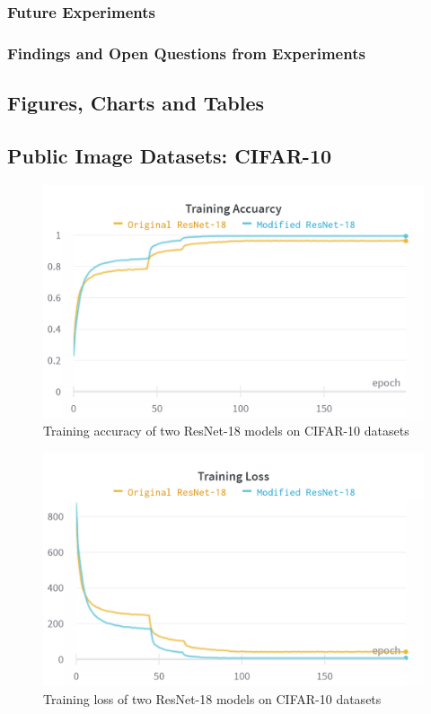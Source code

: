 \documentclass[twocolumn, draft]{extarticle}
\begin{document}
\subsubsection{Future Experiments}
\subsubsection{Findings and Open Questions from Experiments}


\clearpage
{}%
\renewcommand*{\thepage}{A. \arabic{page}}
\begin{appendices}
\section{Figures, Charts and Tables}

\subsection{Public Image Datasets: CIFAR-10}

\begin{figure}[H]
\centering
\includegraphics[width=0.9\linewidth]{charts/Section-2-Panel-0-uzzeut0la}
\caption{Training accuracy of two ResNet-18 models on CIFAR-10 datasets}
\label{chart: res_1}
\end{figure}

\begin{figure}[H]
\centering
\includegraphics[width=0.9\linewidth]{charts/Section-2-Panel-1-crmf3l46q}
\caption{Training loss of two ResNet-18 models on CIFAR-10 datasets}
\label{chart: res_2}
\end{figure}


\end{appendices}
\end{document}
